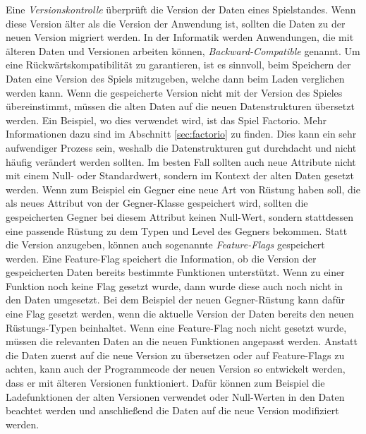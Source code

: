 Eine \textit{Versionskontrolle} überprüft die Version der Daten eines Spielstandes. Wenn diese Version älter als die Version der Anwendung ist, sollten die Daten zu der neuen Version migriert werden. In der Informatik werden Anwendungen, die mit älteren Daten und Versionen arbeiten können, \textit{Backward-Compatible} genannt.\cite{mediumEnsuringBackwards} Um eine Rückwärtskompatibilität zu garantieren, ist es sinnvoll, beim Speichern der Daten eine Version des Spiels mitzugeben, welche dann beim Laden verglichen werden kann. Wenn die gespeicherte Version nicht mit der Version des Spieles übereinstimmt, müssen die alten Daten auf die neuen Datenstrukturen übersetzt werden. Ein Beispiel, wo dies verwendet wird, ist das Spiel Factorio. Mehr Informationen dazu sind im Abschnitt \ref{sec:factorio} zu finden. Dies kann ein sehr aufwendiger Prozess sein, weshalb die Datenstrukturen gut durchdacht und nicht häufig verändert werden sollten. Im besten Fall sollten auch neue Attribute nicht mit einem Null- oder Standardwert, sondern im Kontext der alten Daten gesetzt werden. Wenn zum Beispiel ein Gegner eine neue Art von Rüstung haben soll, die als neues Attribut von der Gegner-Klasse gespeichert wird, sollten die gespeicherten Gegner bei diesem Attribut keinen Null-Wert, sondern stattdessen eine passende Rüstung zu dem Typen und Level des Gegners bekommen. Statt die Version anzugeben, können auch sogenannte \textit{Feature-Flags} gespeichert werden. Eine Feature-Flag speichert die Information, ob die Version der gespeicherten Daten bereits bestimmte Funktionen unterstützt. Wenn zu einer Funktion noch keine Flag gesetzt wurde, dann wurde diese auch noch nicht in den Daten umgesetzt. Bei dem Beispiel der neuen Gegner-Rüstung kann dafür eine Flag gesetzt werden, wenn die aktuelle Version der Daten bereits den neuen Rüstungs-Typen beinhaltet. Wenn eine Feature-Flag noch nicht gesetzt wurde, müssen die relevanten Daten an die neuen Funktionen angepasst werden. Anstatt die Daten zuerst auf die neue Version zu übersetzen oder auf Feature-Flags zu achten, kann auch der Programmcode der neuen Version so entwickelt werden, dass er mit älteren Versionen funktioniert. Dafür können zum Beispiel die Ladefunktionen der alten Versionen verwendet oder Null-Werten in den Daten beachtet werden und anschließend die Daten auf die neue Version modifiziert werden.\cite{mediumEnsuringBackwards} 

